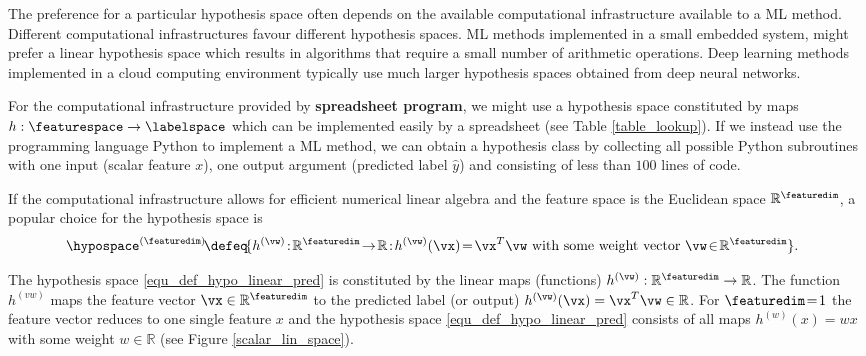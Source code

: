 \documentclass[12pt]{report}
\begin{document}
The preference for a particular hypothesis space often depends 
on the available computational infrastructure available to a ML method. 
Different computational infrastructures favour different hypothesis 
spaces. ML methods implemented in a small embedded system, might 
prefer a linear hypothesis space which results in algorithms that require 
a small number of arithmetic operations. Deep learning methods 
implemented in a cloud computing environment typically use much larger 
hypothesis spaces obtained from deep neural networks. 

For the computational infrastructure provided by {\bf spreadsheet program}, 
we might use a hypothesis space constituted by maps $h: \featurespace \rightarrow \labelspace$ 
which can be implemented easily by a spreadsheet (see Table \ref{table_lookup}). 
If we instead use the programming language Python to implement 
a ML method, we can obtain a hypothesis class by collecting all possible 
Python subroutines with one input (scalar feature $x$), one output 
argument (predicted label $\hat{y}$) and consisting of less than $100$ 
lines of code. %

If the computational infrastructure allows for efficient numerical 
linear algebra and the feature space is the Euclidean space $\mathbb{R}^{\featuredim}$, 
a popular choice for the hypothesis space is  
\begin{align}
\label{equ_def_hypo_linear_pred}
\hspace*{-3mm}\hypospace^{(\featuredim)} \!\defeq\!\{ h^{(\vw)}\!:\!\mathbb{R}^{\featuredim}\!\rightarrow\!\mathbb{R}\!:\!h^{(\vw)}(\vx)\!=\!\vx^{T} \vw \mbox{ with some weight vector } \vw\!\in\!\mathbb{R}^{\featuredim} \}.  
\end{align}

The hypothesis space \eqref{equ_def_hypo_linear_pred} is constituted 
by the linear maps (functions) $h^{(\vw)}: \mathbb{R}^{\featuredim} \rightarrow \mathbb{R}$. 
The function $h^{(vw)}$ maps the feature vector $\vx \in \mathbb{R}^{\featuredim}$ 
to the predicted label (or output) $h^{(\vw)}(\vx) = \vx^{T} \vw \in \mathbb{R}$. 
For $\featuredim\!=\!1$ the feature vector reduces to one single feature $x$ and 
the hypothesis space \eqref{equ_def_hypo_linear_pred} consists of all maps 
$h^{(w)}(x) = w x$ with some weight $w \in \mathbb{R}$ (see Figure \ref{scalar_lin_space}). 
\end{document}
